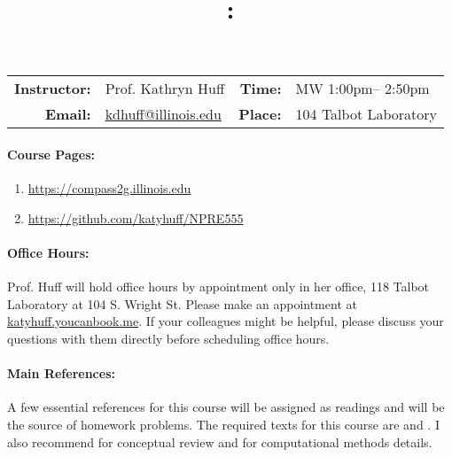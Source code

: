 \documentclass[11pt, a4paper]{article}
\title{\CourseNumber: \CourseTitle\\}
\author{\CourseUniversity}
\date{\CourseSemester \CourseYear}
\makeatletter
\newcommand{\CourseNumber}{NPRE555}
\newcommand{\CourseDays}{MW\xspace}%
\newcommand{\CourseStart}{1:00pm\xspace}%
\newcommand{\CourseEnd}{2:50pm\xspace}%
\newcommand{\CourseInstructor}{Prof. Kathryn Huff}
\newcommand{\CourseInstructorEmail}{kdhuff@illinois.edu}
\newcommand{\CourseRoom}{104\xspace}%
\newcommand{\CourseBuilding}{Talbot Laboratory\xspace}%
\newcommand{\TeachingAssistant}{TA Name\xspace}%
\newcommand{\TAOfficeHourDays}{Wednesdays\xspace}%
\newcommand{\TAOfficeHourStart}{1:00pm\xspace}%
\newcommand{\TAOfficeHourEnd}{3:00pm\xspace}%
\newcommand{\TAOfficeHourPlace}{123 Talbot Laboratory\xspace}
\makeatother
\begin{document}
\maketitle
\renewcommand{\arraystretch}{2}
\begin{center}
\begin{table}[h]
\begin{tabularx}{\textwidth}{rXrX}
\hline
\textbf{Instructor:} & \CourseInstructor & \textbf{Time:} & \CourseDays \CourseStart -- \CourseEnd \\
\textbf{Email:} &  \href{mailto:\CourseInstructorEmail}{\CourseInstructorEmail} & \textbf{Place:} & \CourseRoom \CourseBuilding\\
\hline
\end{tabularx}

\end{table}
\end{center}

\paragraph{Course Pages:}
\begin{enumerate}
        \item \url{https://compass2g.illinois.edu}
        \item \url{https://github.com/katyhuff/\CourseNumber}
\end{enumerate}


\paragraph{Office Hours:} Prof. Huff will hold office hours by appointment only
in her office, 118 Talbot Laboratory at 104 S. Wright St.  Please make an appointment at 
\url{katyhuff.youcanbook.me}. If your colleagues might be helpful, please 
discuss your questions with them directly before scheduling office hours.

\paragraph{Main References:}
A few essential references for this course will be assigned as readings and 
will be the source of homework problems. The required texts for this course are 
\cite{stacey_nuclear_2007} and \cite{bell_nuclear_1970}. I also recommend 
\cite{duderstadt_transport_1979} for conceptual review and 
\cite{lewis_computational_1993} for computational methods details.

\renewcommand{\refname}{\normalfont\selectfont\normalsize}\vspace{-1cm}

\end{document}
